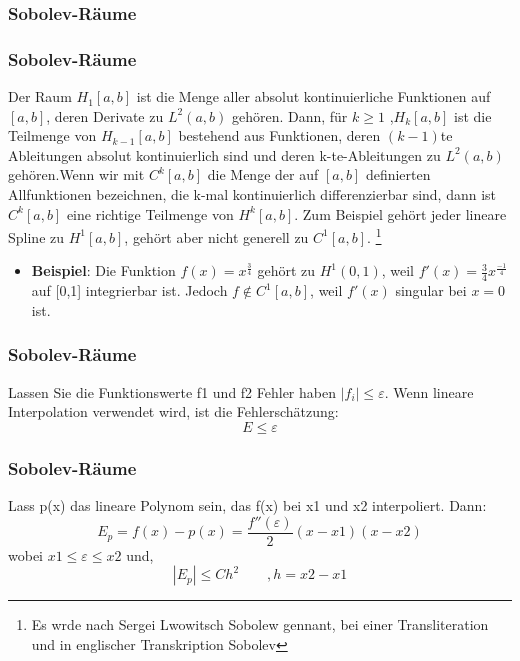 {		
		\subsubsection{Sobolev-Räume}
		\begin{frame}
			\frametitle{Sobolev-Räume}
			Der Raum \(H_1[a,b]\) ist die Menge aller absolut kontinuierliche Funktionen auf \([a, b]\), deren Derivate zu \(L^2(a,b)\) gehören.
			Dann, für \(k \geq 1\) ,\(H_k[a,b]\) ist die Teilmenge von \(H_{k-1}[a,b]\) bestehend aus Funktionen, deren \((k-1)\)te Ableitungen absolut kontinuierlich sind und deren k-te-Ableitungen zu \(L^2(a,b)\) gehören.Wenn wir mit \(C^k[a,b]\) die Menge der auf \([a, b]\) definierten Allfunktionen bezeichnen, die k-mal kontinuierlich differenzierbar sind, dann ist \(C^k[a,b]\) eine richtige Teilmenge von \(H^k[a,b]\). Zum Beispiel gehört jeder lineare Spline zu \(H^1[a,b]\), gehört aber nicht generell zu \(C^1[a,b]\).\cite{sobolev} \footnote{Es wrde nach Sergei Lwowitsch Sobolew gennant, bei einer Transliteration und in englischer Transkription Sobolev}
			
			\begin{itemize}                
				\item \textbf{Beispiel}:
				Die Funktion \(f(x)=x^\frac{3}{4}\) gehört zu \(H^1(0, 1)\), weil \(f'(x)=\frac{3}{4} x^\frac{-1}{4}\) auf [0,1] integrierbar ist.
				Jedoch \(f \notin C^1[a,b]\), weil \(f'(x)\) singular bei \(x= 0\) ist. 
			\end{itemize}
		\end{frame}
		
		\begin{frame}
			\frametitle{Sobolev-Räume}
			\begin{lemma}
				Lassen Sie die Funktionswerte f1 und f2 Fehler haben \(|f_i| \leq \varepsilon\). Wenn lineare Interpolation verwendet wird, ist die Fehlerschätzung: \[E \leq \varepsilon\]
			\end{lemma}
		\end{frame}
		\begin{frame}
			\frametitle{Sobolev-Räume}
			\begin{theorem}\cite{sobolev}
				Lass p(x) das lineare Polynom sein, das f(x) bei x1 und x2 interpoliert. Dann:
				\[E_p = f(x) - p(x)= \frac{f''(\varepsilon)}{2} (x-x1)(x-x2)\] wobei \(x1 \leq \varepsilon \leq x2\) und,
				\[|E_p| \leq C h^2 \hspace{2em} ,h=x2 - x1\]
			\end{theorem}
		\end{frame}
		
}

